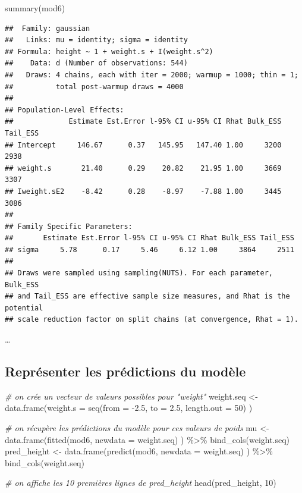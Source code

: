 \documentclass[
  a4paper,11pt,twoside,onecolumn,openright,final,oldfontcommands]{memoir}
\newenvironment{Shaded}{\begin{snugshade}}{\end{snugshade}}
\newcommand{\AttributeTok}[1]{\textcolor[rgb]{0.77,0.63,0.00}{#1}}
\newcommand{\CommentTok}[1]{\textcolor[rgb]{0.56,0.35,0.01}{\textit{#1}}}
\newcommand{\DecValTok}[1]{\textcolor[rgb]{0.00,0.00,0.81}{#1}}
\newcommand{\FloatTok}[1]{\textcolor[rgb]{0.00,0.00,0.81}{#1}}
\newcommand{\FunctionTok}[1]{\textcolor[rgb]{0.00,0.00,0.00}{#1}}
\newcommand{\NormalTok}[1]{#1}
\newcommand{\OtherTok}[1]{\textcolor[rgb]{0.56,0.35,0.01}{#1}}
\newcommand{\SpecialCharTok}[1]{\textcolor[rgb]{0.00,0.00,0.00}{#1}}
\theoremstyle{definition}
\theoremstyle{definition}
\theoremstyle{definition}
\theoremstyle{definition}
\theoremstyle{remark}
\begin{document}
\begin{Shaded}
\begin{Highlighting}[]
\FunctionTok{summary}\NormalTok{(mod6)}
\end{Highlighting}
\end{Shaded}

\begin{verbatim}
##  Family: gaussian 
##   Links: mu = identity; sigma = identity 
## Formula: height ~ 1 + weight.s + I(weight.s^2) 
##    Data: d (Number of observations: 544) 
##   Draws: 4 chains, each with iter = 2000; warmup = 1000; thin = 1;
##          total post-warmup draws = 4000
## 
## Population-Level Effects: 
##             Estimate Est.Error l-95% CI u-95% CI Rhat Bulk_ESS Tail_ESS
## Intercept     146.67      0.37   145.95   147.40 1.00     3200     2938
## weight.s       21.40      0.29    20.82    21.95 1.00     3669     3307
## Iweight.sE2    -8.42      0.28    -8.97    -7.88 1.00     3445     3086
## 
## Family Specific Parameters: 
##       Estimate Est.Error l-95% CI u-95% CI Rhat Bulk_ESS Tail_ESS
## sigma     5.78      0.17     5.46     6.12 1.00     3864     2511
## 
## Draws were sampled using sampling(NUTS). For each parameter, Bulk_ESS
## and Tail_ESS are effective sample size measures, and Rhat is the potential
## scale reduction factor on split chains (at convergence, Rhat = 1).
\end{verbatim}

\ldots{}

\hypertarget{repruxe9senter-les-pruxe9dictions-du-moduxe8le-1}{%
\subsection{Représenter les prédictions du modèle}\label{repruxe9senter-les-pruxe9dictions-du-moduxe8le-1}}

\begin{Shaded}
\begin{Highlighting}[]
\CommentTok{\# on crée un vecteur de valeurs possibles pour "weight"}
\NormalTok{weight.seq }\OtherTok{\textless{}{-}} \FunctionTok{data.frame}\NormalTok{(}\AttributeTok{weight.s =} \FunctionTok{seq}\NormalTok{(}\AttributeTok{from =} \SpecialCharTok{{-}}\FloatTok{2.5}\NormalTok{, }\AttributeTok{to =} \FloatTok{2.5}\NormalTok{, }\AttributeTok{length.out =} \DecValTok{50}\NormalTok{) )}

\CommentTok{\# on récupère les prédictions du modèle pour ces valeurs de poids}
\NormalTok{mu }\OtherTok{\textless{}{-}} \FunctionTok{data.frame}\NormalTok{(}\FunctionTok{fitted}\NormalTok{(mod6, }\AttributeTok{newdata =}\NormalTok{ weight.seq) ) }\SpecialCharTok{\%\textgreater{}\%} \FunctionTok{bind\_cols}\NormalTok{(weight.seq)}
\NormalTok{pred\_height }\OtherTok{\textless{}{-}} \FunctionTok{data.frame}\NormalTok{(}\FunctionTok{predict}\NormalTok{(mod6, }\AttributeTok{newdata =}\NormalTok{ weight.seq) ) }\SpecialCharTok{\%\textgreater{}\%} \FunctionTok{bind\_cols}\NormalTok{(weight.seq)}

\CommentTok{\# on affiche les 10 premières lignes de pred\_height}
\FunctionTok{head}\NormalTok{(pred\_height, }\DecValTok{10}\NormalTok{)}
\end{Highlighting}
\end{Shaded}
\end{document}
